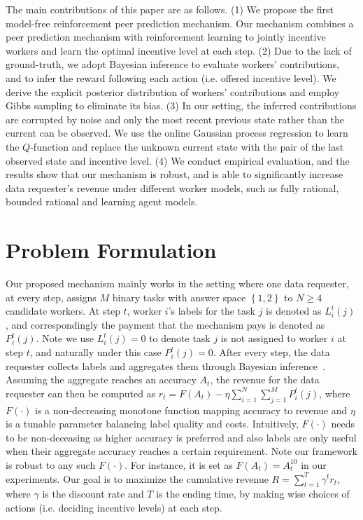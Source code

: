\documentclass{article}
\begin{document}
The main contributions of this paper are as follows.
(1) We propose the first model-free reinforcement peer prediction mechanism.
Our mechanism combines a peer prediction mechanism with reinforcement learning to jointly incentive workers and learn the optimal incentive level at each step.
(2) Due to the lack of ground-truth, we adopt Bayesian inference to evaluate workers' contributions, and to infer the reward following each action (i.e. offered incentive level). We derive the explicit posterior distribution of workers' contributions and employ Gibbs sampling to eliminate its bias.
(3) In our setting, the inferred contributions are corrupted by noise and only the most recent previous state rather than the current can be observed. We use the online Gaussian process regression to learn the $Q$-function and replace the unknown current state with the pair of the last observed state and incentive level.
(4) We conduct empirical evaluation, and the results show that our mechanism is robust, and is able to significantly increase data requester's revenue under different worker models, such as fully rational, bounded rational and learning agent models.

\section{Problem Formulation}
Our proposed mechanism mainly works in the setting where one data requester, at every step, assigns $M$ binary tasks with answer space $\left\{1,2\right\}$ to $N \geq 4$ candidate workers. At step $t$, worker $i$'s labels for the task $j$ is denoted as $L_i^t(j)$, and correspondingly the payment that the mechanism pays is denoted as $P^{t}_i(j)$. Note we use $L^{t}_i(j)=0$ to denote task $j$ is not assigned to worker $i$ at step $t$, and naturally under this case $P^{t}_i(j)=0$.
After every step, the data requester collects labels and aggregates them through Bayesian inference~\cite{zheng2017truth}.
Assuming the aggregate reaches an accuracy $A_t$,  the revenue for the data requester can then be computed as
$r_t = F(A_t) - \eta {\sum}_{i=1}^{N}{\sum}_{j=1}^{M}P^t_i(j)$,
where $F(\cdot)$ is a non-decreasing monotone
 function mapping accuracy to revenue and $\eta$ is a
tunable parameter balancing label quality and costs. Intuitively, $F(\cdot)$ needs to be non-deceasing as higher accuracy is preferred and also labels are only useful when their aggregate accuracy reaches a certain requirement. Note our framework is robust to any such $F(\cdot)$. For instance, it is set as $F(A_t)=A^{10}_t$ in our experiments.
Our goal is to maximize the cumulative revenue $R = \sum_{t=1}^{T} \gamma^t r_t$, where $\gamma$ is the discount rate and $T$ is the ending time, by making wise choices of actions  (i.e. deciding incentive levels) at each step.
\end{document}
